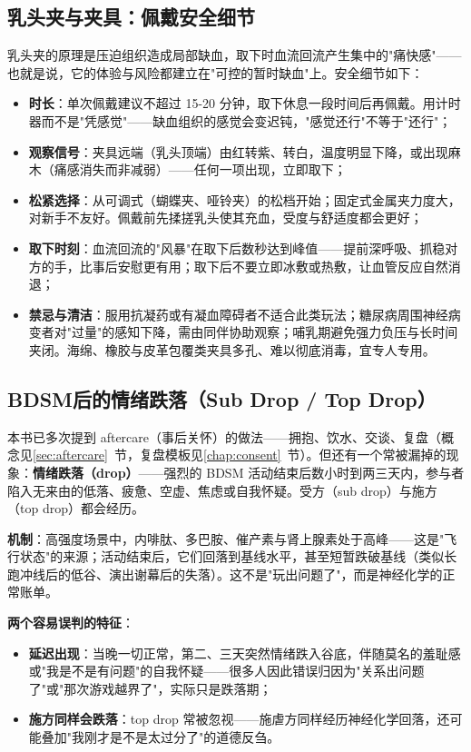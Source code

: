 \documentclass[12pt,UTF8]{ctexbook}
\begin{document}
\subsection{乳头夹与夹具：佩戴安全细节}

乳头夹的原理是压迫组织造成局部缺血，取下时血流回流产生集中的"痛快感"——也就是说，它的体验与风险都建立在"可控的暂时缺血"上。安全细节如下：

\begin{itemize}
\item \textbf{时长}：单次佩戴建议不超过 15-20 分钟，取下休息一段时间后再佩戴。用计时器而不是"凭感觉"——缺血组织的感觉会变迟钝，"感觉还行"不等于"还行"；
\item \textbf{观察信号}：夹具远端（乳头顶端）由红转紫、转白，温度明显下降，或出现麻木（痛感消失而非减弱）——任何一项出现，立即取下；
\item \textbf{松紧选择}：从可调式（蝴蝶夹、哑铃夹）的松档开始；固定式金属夹力度大，对新手不友好。佩戴前先揉搓乳头使其充血，受度与舒适度都会更好；
\item \textbf{取下时刻}：血流回流的"风暴"在取下后数秒达到峰值——提前深呼吸、抓稳对方的手，比事后安慰更有用；取下后不要立即冰敷或热敷，让血管反应自然消退；
\item \textbf{禁忌与清洁}：服用抗凝药或有凝血障碍者不适合此类玩法；糖尿病周围神经病变者对"过量"的感知下降，需由同伴协助观察；哺乳期避免强力负压与长时间夹闭。海绵、橡胶与皮革包覆类夹具多孔、难以彻底消毒，宜专人专用。
\end{itemize}

\subsection{BDSM后的情绪跌落（Sub Drop / Top Drop）}\label{sec:drop}

本书已多次提到 aftercare（事后关怀）的做法——拥抱、饮水、交谈、复盘（概念见\ref{sec:aftercare}~节，复盘模板见\ref{chap:consent}~节）。但还有一个常被漏掉的现象：\textbf{情绪跌落（drop）}——强烈的 BDSM 活动结束后数小时到两三天内，参与者陷入无来由的低落、疲惫、空虚、焦虑或自我怀疑。受方（sub drop）与施方（top drop）都会经历。

\textbf{机制}：高强度场景中，内啡肽、多巴胺、催产素与肾上腺素处于高峰——这是"飞行状态"的来源；活动结束后，它们回落到基线水平，甚至短暂跌破基线（类似长跑冲线后的低谷、演出谢幕后的失落）。这不是"玩出问题了"，而是神经化学的正常账单。

\textbf{两个容易误判的特征}：
\begin{itemize}
\item \textbf{延迟出现}：当晚一切正常，第二、三天突然情绪跌入谷底，伴随莫名的羞耻感或"我是不是有问题"的自我怀疑——很多人因此错误归因为"关系出问题了"或"那次游戏越界了"，实际只是跌落期；
\item \textbf{施方同样会跌落}：top drop 常被忽视——施虐方同样经历神经化学回落，还可能叠加"我刚才是不是太过分了"的道德反刍。
\end{itemize}
\end{document}
